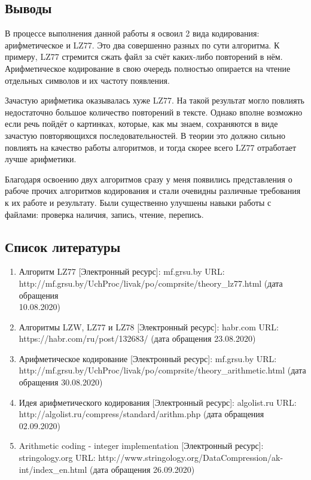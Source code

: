 \documentclass[12pt]{article}
\begin{document}
\subsection*{Выводы}%

В процессе выполнения данной работы я освоил 2 вида кодирования: арифметическое и LZ77. Это два совершенно разных по сути алгоритма. К примеру, LZ77 стремится сжать файл за счёт каких-либо повторений в нём. Арифметическое кодирование в свою очередь полностью опирается на чтение отдельных символов и их частоту появления. 

Зачастую арифметика оказывалась хуже LZ77. На такой результат могло повлиять недостаточно большое количество повторений в тексте. Однако вполне возможно если речь пойдёт о картинках, которые, как мы знаем, сохраняются в виде зачастую повторяющихся последовательностей. В теории это должно сильно повлиять на качество работы алгоритмов, и тогда скорее всего LZ77 отработает лучше арифметики.

Благодаря освоению двух алгоритмов сразу у меня появились представления о рабоче прочих алгоритмов кодирования и стали очевидны различные требования к их работе и результату. Были существенно улучшены навыки работы с файлами: проверка наличия, запись, чтение, перепись.

\subsection*{Список литературы}
\begin{enumerate}
	\item Алгоритм LZ77 [Электронный ресурс]: mf.grsu.by URL:\\ http://mf.grsu.by/UchProc/livak/po/comprsite/theory\_lz77.html (дата обращения\\ 10.08.2020)
	\item Алгоритмы LZW, LZ77 и LZ78 [Электронный ресурс]: habr.com URL:\\ https://habr.com/ru/post/132683/ (дата обращения 23.08.2020)
	\item Арифметическое кодирование [Электронный ресурс]: mf.grsu.by URL:\\ http://mf.grsu.by/UchProc/livak/po/comprsite/theory\_arithmetic.html (дата обращения 30.08.2020)
	\item Идея арифметического кодирования [Электронный ресурс]: algolist.ru URL:\\ http://algolist.ru/compress/standard/arithm.php (дата обращения 02.09.2020)
	\item Arithmetic coding - integer implementation [Электронный ресурс]: stringology.org URL: http://www.stringology.org/DataCompression/ak-int/index\_en.html (дата обращения 26.09.2020)
\end{enumerate}
\end{document}
